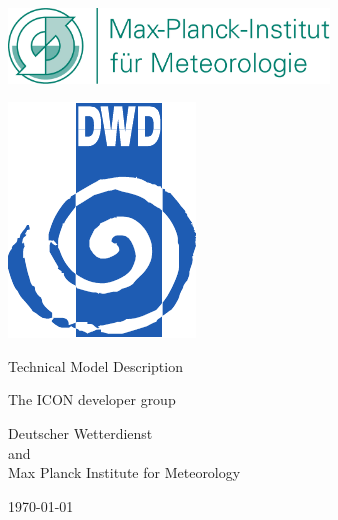 \documentclass[DIV16,BCOR1cm,11pt,a4paper,twoside]{scrbook}
\begin{document}
\pagestyle{empty}

\renewcommand{\footnoterule}{\rule{0pt}{0pt}\vspace{0pt}}

\begin{center}
\ifpdf
\parbox{2cm}{
\includegraphics[height=2cm]{../resources/img/mpilogo.pdf}
}
\hfill
\parbox{2cm}{
\includegraphics{../resources/img/dwdlogo.pdf}
}
\fi
\end{center}

\vspace{2cm}

\begin{center}
{\sectfont\Huge
\color{mpggreen}Technical Model Description\color{black}\\[0.5ex]
}
\end{center}

\vspace{2cm}

\begin{center}
{\sectfont\Large
The ICON developer group}
\end{center}

\vspace{1cm}

\begin{center}
{\sectfont\Large
Deutscher Wetterdienst\\and\\
Max Planck Institute for Meteorology\\

\vspace{1cm}

\today}
\end{center}
\cleardoublepage
\end{document}
